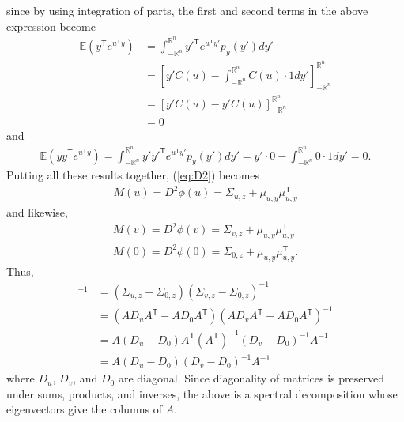 \documentclass[a4paper,12pt]{article}
\theoremstyle{remark}
\newcommand{\transpose}{\mathsf{T}}
\begin{document}
    since by using integration of parts, the first and second terms in the above expression become
    \begin{align*}
        \mathbb{E}(y^\transpose e^{u^\transpose y}) &= \int_{-\mathbb{R}^n}^{\mathbb{R}^n} y'^\transpose e^{u^\transpose y'} p_y(y') dy' \\
        &= \left[ y'C(u) - \int_{-\mathbb{R}^n}^{\mathbb{R}^n} C(u) \cdot 1 dy' \right]_{-\mathbb{R}^n}^{\mathbb{R}^n} \\
        &= \left[ y'C(u) - y'C(u) \right]_{-\mathbb{R}^n}^{\mathbb{R}^n} \\
        &= 0
    \end{align*}
    and
    \begin{align*}
        \mathbb{E}(yy^\transpose e^{u^\transpose y}) = \int_{-\mathbb{R}^n}^{\mathbb{R}^n} y'y'^\transpose e^{u^\transpose y'} p_y(y') dy' = y' \cdot 0 - \int_{-\mathbb{R}^n}^{\mathbb{R}^n} 0 \cdot 1 dy' = 0.
    \end{align*}
    Putting all these results together, (\ref{eq:D2}) becomes
    \begin{align*}
        M(u) = D^2 \phi(u) = \Sigma_{u, z} + \mu_{u, y} \mu_{u, y}^\transpose
    \end{align*}
    and likewise,
    \begin{gather*}
        M(v) = D^2 \phi(v) = \Sigma_{v, z} + \mu_{u, y} \mu_{u, y}^\transpose \\
        M(0) = D^2 \phi(0) = \Sigma_{0, z} + \mu_{u, y} \mu_{u, y}^\transpose.
    \end{gather*}
    Thus,
    \begin{align*}
        [M(u) - M(0)][M(v) - M(0)]^{-1} &= (\Sigma_{u, z} - \Sigma_{0, z}) (\Sigma_{v, z} - \Sigma_{0, z})^{-1} \\
        &= (AD_uA^\transpose - AD_0A^\transpose)(AD_vA^\transpose - AD_0A^\transpose)^{-1} \\
        &= A(D_u - D_0)A^\transpose (A^\transpose)^{-1}(D_v - D_0)^{-1}A^{-1} \\
        &= A(D_u - D_0)(D_v - D_0)^{-1}A^{-1}
    \end{align*}
    where $D_u$, $D_v$, and $D_0$ are diagonal. Since diagonality of matrices is preserved under sums, products, and inverses, the above is a spectral decomposition whose eigenvectors give the columns of $A$.
\end{document}
